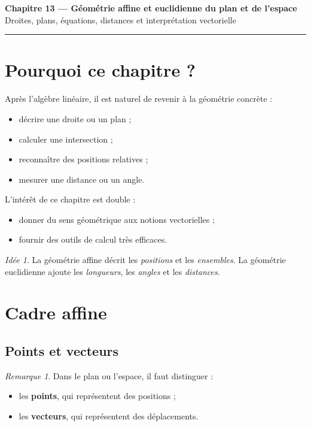 \documentclass[11pt,a4paper]{article}
\theoremstyle{remark}
\newtheorem{remarque}[definition]{Remarque}
\newtheorem*{idee}{Idée}
\begin{document}
\begin{center}
    {\LARGE \textbf{Chapitre 13 --- Géométrie affine et euclidienne du plan et de l’espace}}\\[0.4em]
    {\large Droites, plans, équations, distances et interprétation vectorielle}
\end{center}

\hrule
\vspace{1em}

\tableofcontents

\newpage

\section{Pourquoi ce chapitre ?}

Après l’algèbre linéaire, il est naturel de revenir à la géométrie concrète :
\begin{itemize}
    \item décrire une droite ou un plan ;
    \item calculer une intersection ;
    \item reconnaître des positions relatives ;
    \item mesurer une distance ou un angle.
\end{itemize}

L’intérêt de ce chapitre est double :
\begin{itemize}
    \item donner du sens géométrique aux notions vectorielles ;
    \item fournir des outils de calcul très efficaces.
\end{itemize}

\begin{idee}
La géométrie affine décrit les \emph{positions} et les \emph{ensembles}.  
La géométrie euclidienne ajoute les \emph{longueurs}, les \emph{angles} et les \emph{distances}.
\end{idee}

\section{Cadre affine}

\subsection{Points et vecteurs}

\begin{remarque}
Dans le plan ou l’espace, il faut distinguer :
\begin{itemize}
    \item les \textbf{points}, qui représentent des positions ;
    \item les \textbf{vecteurs}, qui représentent des déplacements.
\end{itemize}
\end{remarque}
\end{document}
